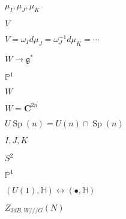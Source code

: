 \begin{preview}
\setcounter{equation}{0}%
\( \mu_I, \mu_J, \mu_K \)
\end{preview}

\begin{preview}
\setcounter{equation}{0}%
\( V \)
\end{preview}

\begin{preview}
\setcounter{equation}{0}%
\( V = \omega_I d\mu_J = \omega_J ^{-1} d\mu_K =\cdots \)
\end{preview}

\begin{preview}
\setcounter{equation}{0}%
\( W \to \mathfrak{g}^{*} \)
\end{preview}

\begin{preview}
\setcounter{equation}{0}%
\( \mathbb{P}^1 \)
\end{preview}

\begin{preview}
\setcounter{equation}{0}%
\( W \)
\end{preview}

\begin{preview}
\setcounter{equation}{0}%
\( W = \mathbf{C}^{2n} \)
\end{preview}

\begin{preview}
\setcounter{equation}{0}%
\( U \operatorname{Sp}(n) = U(n)\cap \operatorname{Sp}(n) \)
\end{preview}

\begin{preview}
\setcounter{equation}{0}%
\( I,J,K \)
\end{preview}

\begin{preview}
\setcounter{equation}{0}%
\( S^2 \)
\end{preview}

\begin{preview}
\setcounter{equation}{0}%
\( \mathbb{P}^1 \)
\end{preview}

\begin{preview}
\setcounter{equation}{0}%
\( (U(1), \mathbb{H})\leftrightarrow (\bullet,  \mathbb{H}) \)
\end{preview}

\begin{preview}
\setcounter{equation}{0}%
\( Z_{3dB, W / / / G}(N) \)
\end{preview}

